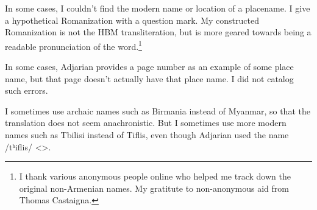 In some cases, I couldn't find the modern name or location of a placename. I give a hypothetical Romanization  with a question mark. My constructed Romanization is not the HBM transliteration, but is more geared towards being a readable pronunciation of the word.\footnote{I thank various anonymous people online who helped me track down the original non-Armenian names. My gratitute to non-anonymous  aid from Thomas Castaigna. }

In some cases, Adjarian provides a page number as an example of some place name, but that page doesn't actually have that place name. I did not  catalog such errors. 

I sometimes use archaic names such as Birmania instead of Myanmar, so that the translation does not seem anachronistic. But I sometimes use more modern names such as Tbilisi instead of Tiflis, even though Adjarian used the name /tʰiflis/ <>.


